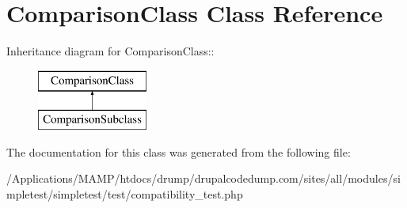 \hypertarget{class_comparison_class}{
\section{ComparisonClass Class Reference}
\label{class_comparison_class}
}
Inheritance diagram for ComparisonClass::\begin{figure}[H]
\begin{center}
\leavevmode
\includegraphics[height=2cm]{class_comparison_class}
\end{center}
\end{figure}


The documentation for this class was generated from the following file:\begin{DoxyCompactItemize}
\item 
/Applications/MAMP/htdocs/drump/drupalcodedump.com/sites/all/modules/simpletest/simpletest/test/compatibility\_\-test.php\end{DoxyCompactItemize}
